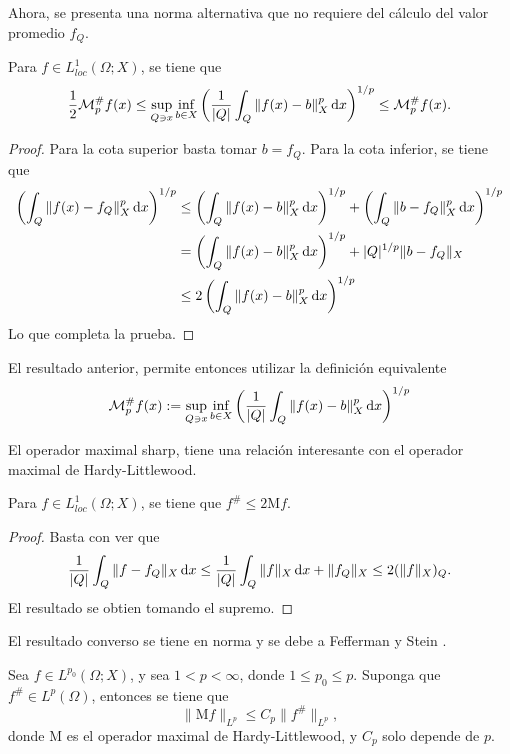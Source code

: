 Ahora, se presenta una norma alternativa que no requiere del cálculo del valor promedio $f_Q$.
\begin{proposition}
	Para $f\in L^1_{loc}(\Omega;X)$, se tiene que 
	\begin{equation*}
		\frac{1}{2}\mathcal{M}_p^\# f(x) \leq \sup_{Q\ni x} \inf_{b\in X}\left(\frac{1}{|Q|} \int_Q \|f(x)-b\|_X^p\mathop{}\!\mathrm{d} x\right)^{1/p} \leq \mathcal{M}_p^\# f(x). 
	\end{equation*}
\end{proposition}
\begin{proof}
	Para la cota superior basta tomar $b=f_Q$. Para la cota inferior, se tiene que
	\begin{align*}
		\left(\int_Q \|f(x) - f_Q\|_X^p\mathop{}\!\mathrm{d} x\right)^{1/p} & \leq \left(\int_Q \|f(x) - b\|_X^p \mathop{}\!\mathrm{d} x\right)^{1/p} + \left(\int_Q \|b- f_Q\|_X^p\mathop{}\!\mathrm{d} x\right)^{1/p} \\
		& =  \left(\int_Q \|f(x) - b\|_X^p \mathop{}\!\mathrm{d} x\right)^{1/p} + |Q|^{1/p}\|b-f_Q\|_X\\
		& \leq 2 \left(\int_Q \|f(x) - b\|_X^p \mathop{}\!\mathrm{d} x\right)^{1/p}
	\end{align*}
	Lo que completa la prueba.
\end{proof}
\begin{remark}
	El resultado anterior, permite entonces utilizar la definición equivalente 
	\begin{equation*}
		\mathcal{M}_p^\# f(x) := \sup_{Q\ni x} \inf_{b\in X}\left(\frac{1}{|Q|} \int_Q \|f(x)-b\|_X^p\mathop{}\!\mathrm{d} x\right)^{1/p} 
	\end{equation*}
\end{remark}
El operador maximal sharp, tiene una relación interesante con el operador maximal de Hardy-Littlewood.
\begin{theorem}
	Para $f\in L^1_{loc}(\Omega;X)$, se tiene que $f^\# \leq 2\mathrm{M}f$.
\end{theorem}
\begin{proof}
	Basta con ver que 
	\begin{equation*}
		\frac{1}{|Q|}\int_Q\|f-f_Q\|_X \mathop{}\!\mathrm{d} x \leq \frac{1}{|Q|} \int_Q \|f\|_X\mathop{}\!\mathrm{d} x + \|f_Q\|_X \leq 2(\|f\|_X)_Q.
	\end{equation*}
	El resultado se obtien tomando el supremo.
\end{proof}
El resultado converso se tiene en norma y se debe a Fefferman y Stein \cite{fefferman-stein}.
\begin{theorem}\label{theo:sharp-hardy-littlewood}
	Sea $f\in L^{p_0}(\Omega; X)$, y sea $1<p<\infty$, donde $1\leq p_0\leq p$. Suponga que $f^\#\in L^p(\Omega)$, entonces se tiene que 
	\begin{equation*}
		\|\mathrm{M}f\|_{L^p} \leq C_p \|f^\#\|_{L^p},
	\end{equation*}
	donde $\mathrm{M}$ es el operador maximal de Hardy-Littlewood, y $C_p$ solo depende de $p$.
\end{theorem}
